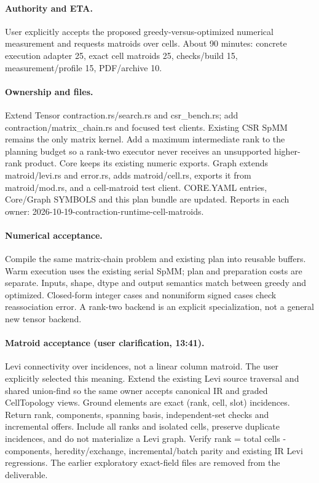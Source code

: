 \documentclass[11pt,a4paper]{article}
\begin{document}
\paragraph{Authority and ETA.} User explicitly accepts the proposed greedy-versus-optimized
numerical measurement and requests matroids over cells. About 90 minutes: concrete execution
adapter 25, exact cell matroids 25, checks/build 15, measurement/profile 15, PDF/archive 10.
\paragraph{Ownership and files.} Extend Tensor contraction.rs/search.rs and csr\_bench.rs;
add contraction/matrix\_chain.rs and focused test clients. Existing CSR
SpMM remains the only matrix kernel. Add a maximum intermediate rank to the planning budget
so a rank-two executor never receives an unsupported higher-rank product. Core keeps its existing numeric exports. Graph extends matroid/levi.rs and error.rs, adds matroid/cell.rs, exports it from matroid/mod.rs,
and a cell-matroid test client. CORE.YAML entries, Core/Graph SYMBOLS and this plan bundle
are updated. Reports in each owner: 2026-10-19-contraction-runtime-cell-matroids.
\paragraph{Numerical acceptance.} Compile the same matrix-chain problem and existing plan
into reusable buffers. Warm execution uses the existing serial SpMM; plan and preparation
costs are separate. Inputs, shape, dtype and output semantics match between greedy and
optimized. Closed-form integer cases and nonuniform signed cases check reassociation error.
A rank-two backend is an explicit specialization, not a general new tensor backend.
\paragraph{Matroid acceptance (user clarification, 13:41).} Levi connectivity over
incidences, not a linear column matroid. The user explicitly selected this meaning.
Extend the existing Levi source traversal and shared union-find so the same owner
accepts canonical IR and graded CellTopology views. Ground elements are exact
(rank, cell, slot) incidences. Return rank, components, spanning basis, independent-set
checks and incremental offers. Include all ranks and isolated cells, preserve duplicate
incidences, and do not materialize a Levi graph. Verify rank = total cells - components,
heredity/exchange, incremental/batch parity and existing IR Levi regressions.
The earlier exploratory exact-field files are removed from the deliverable.
\end{document}
